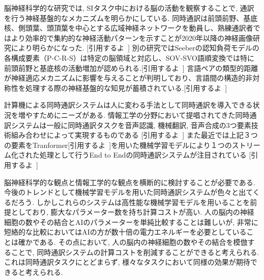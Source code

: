 脳神経科学的な研究では, SIタスク中における脳の活動を観察することで, 通訳を行う神経基盤的なメカニズムを明らかにしている.
同時通訳は前頭前野、基底核、側頭葉、頭頂葉を中心とする広域神経ネットワークを動員し、熟練通訳者ではより効率的で集約的な神経活動パターンを示すことが2020年以降の神経画像研究により明らかになった. [引用するよ~]
別の研究ではSeeberの認知負荷モデルの各構成要素（P-C-R-S）は特定の脳領域と対応し、SOV-SVO語順変換では特に前頭前野と基底核の活動増加が認められる.[引用するよ~]
言語ペアの類型的距離が神経適応メカニズムに影響を与えることが判明しており、言語間の構造的非対称性を処理する際の神経基盤的な知見が蓄積されている.[引用するよ~]

計算機による同時通訳システムは人に変わる手法として同時通訳を導入できる状況を増やすためにニーズがある.
情報工学の分野において提唱されてきた同時通訳システムは一般に同時通訳タスクを音声認識, 機械翻訳, 音声合成の3つ要素技術組み合わせによって実現するものである [引用するよ~]
また最近では上記３つの要素をTranformer[引用するよ~]を用いた機械学習モデルにより１つのストリーム化された処理として行うEnd to Endの同時通訳システムが注目されている [引用するよ~]

脳神経科学的な観点と情報工学的な観点を横断的に検討することが必要である.
今後のトレンドとして機械学習モデルを用いた同時通訳システムが色々と出てくるだろう.
しかしこれらのシステムは高性能な機械学習モデルを用いることを前提としており, 膨大なパラメーター数を持ち計算コストが高い.
人の脳内の神経細胞の数やその結合とAIのパラメーターを単純比較することは難しいが, 非常に短絡的な比較においてはAIの方が数十倍の電力エネルギーを必要としていることは確かである.
その点において, 人の脳内の神経細胞の数やその結合を模倣することで, 同時通訳システムの計算コストを削減することができると考えられる.
これは同時通訳タスクにとどまらず, 様々なタスクにおいて同様の効果が期待できると考えられる.